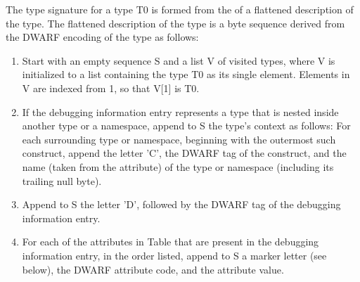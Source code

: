 The type signature for a type T0 is formed from the 
of a flattened description of the type. The flattened
description of the type is a byte sequence derived from the
DWARF encoding of the type as follows:
\begin{enumerate}[1. ]

\item Start with an empty sequence S and a list V of visited
types, where V is initialized to a list containing the type
T0 as its single element. Elements in V are indexed from 1,
so that V[1] is T0.

\item If the debugging information entry represents a type that
is nested inside another type or a namespace, append to S
the type\textquoteright s context as follows: For each surrounding type
or namespace, beginning with the outermost such construct,
append the letter 'C', the DWARF tag of the construct, and
the name (taken from 
the  attribute) of the type
or namespace (including its trailing null byte).

\item  Append to S the letter 'D', followed by the DWARF tag of
the debugging information entry.

\item For each of the attributes in
Table 
that are present in
the debugging information entry, in the order listed,
append to S a marker letter (see below), the DWARF attribute
code, and the attribute value.


\end{enumerate}
